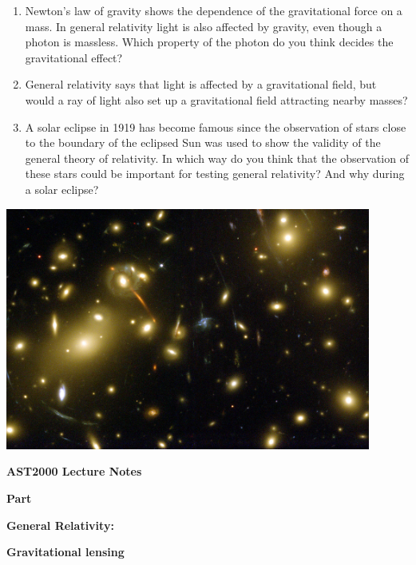 {\large
\begin{enumerate}
\item Newton's law of gravity shows the dependence of the gravitational force on a mass. In general relativity light is also affected by gravity, even though a photon is massless. Which property of the photon do you think decides the gravitational effect?
\item General relativity says that light is affected by a gravitational field, but would a ray of light also set up a gravitational field attracting nearby masses?
\item A solar eclipse in 1919 has become famous since the observation of stars close to the boundary of the eclipsed Sun was used to show the validity of the general theory of relativity. In which way do you think that the observation of these stars could be important for testing general relativity? And why during a solar eclipse?
\end{enumerate}

\begin{Figure}%
\centering
\includegraphics[width=0.9\textwidth]{lensing.jpg}
\end{Figure}


\clearpage
\vspace*{2cm}

{\centerline{\bf\huge AST2000 Lecture Notes}}

\vspace*{1cm}

{\centerline{\bf\LARGE Part \PartName}}\vspace*{0.25cm}
{\centerline{\bf\LARGE General Relativity:}}
{\centerline{\bf\LARGE Gravitational lensing}}


}
